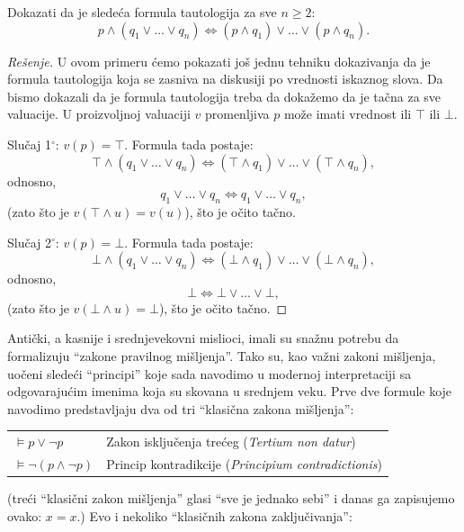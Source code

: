 \begin{EX}
  Dokazati da je slede\'ca formula tautologija za sve $n \ge 2$:
  $$
    p \land (q_1 \lor \ldots \lor q_n) \Leftrightarrow (p \land q_1) \lor \ldots \lor (p \land q_n).
  $$
\end{EX}
\begin{proof}[Re\v senje]
  U ovom primeru \'cemo pokazati jo\v s jednu tehniku dokazivanja da je formula tautologija koja se zasniva na diskusiji
  po vrednosti iskaznog slova. Da bismo dokazali da je formula tautologija treba da doka\v zemo da je ta\v cna za sve valuacije.
  U proizvoljnoj valuaciji $v$ promenljiva $p$ mo\v ze imati vrednost ili $\top$ ili $\bot$.
  
  Slu\v caj 1$^\circ$: $v(p) = \top$. Formula tada postaje:
  $$
    \top \land (q_1 \lor \ldots \lor q_n) \Leftrightarrow (\top \land q_1) \lor \ldots \lor (\top \land q_n),
  $$
  odnosno,
  $$
    q_1 \lor \ldots \lor q_n \Leftrightarrow q_1 \lor \ldots \lor q_n,
  $$
  (zato \v sto je $v(\top \land u) = v(u)$), \v sto je o\v cito ta\v cno.

  Slu\v caj 2$^\circ$: $v(p) = \bot$. Formula tada postaje:
  $$
    \bot \land (q_1 \lor \ldots \lor q_n) \Leftrightarrow (\bot \land q_1) \lor \ldots \lor (\bot \land q_n),
  $$
  odnosno,
  $$
    \bot \Leftrightarrow \bot \lor \ldots \lor \bot,
  $$
  (zato \v sto je $v(\bot \land u) = \bot$), \v sto je o\v cito ta\v cno.
\end{proof}

Anti\v cki, a kasnije i srednjevekovni mislioci, imali su sna\v znu potrebu da formalizuju
\enquote{zakone pravilnog mi\v sljenja}. Tako su, kao va\v zni zakoni mi\v sljenja,
uo\v ceni slede\'ci \enquote{principi} koje sada navodimo u modernoj interpretaciji sa odgovaraju\'cim imenima
koja su skovana u srednjem veku. Prve dve formule koje navodimo predstavljaju dva od tri \enquote{klasi\v cna zakona mi\v sljenja}:

\medskip

\begin{tabular}{ll}
  $\vDash p \lor \lnot p$         & Zakon isklju\v cenja tre\'ceg (\textit{Tertium non datur})\\
  $\vDash \lnot(p \land \lnot p)$ & Princip kontradikcije (\textit{Principium contradictionis})\\
\end{tabular}

\medskip

\noindent
(tre\'ci \enquote{klasi\v cni zakon mi\v sljenja} glasi \enquote{sve je jednako sebi} i danas ga zapisujemo ovako: $x = x$.)
Evo i nekoliko \enquote{klasi\v cnih zakona zaklju\v civanja}:

